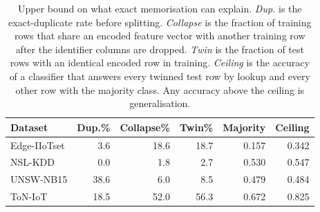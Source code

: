 \begin{table}[t]
\centering
\caption{Upper bound on what exact memorisation can explain. \emph{Dup.} is the exact-duplicate rate before splitting. \emph{Collapse} is the fraction of training rows that share an encoded feature vector with another training row after the identifier columns are dropped. \emph{Twin} is the fraction of test rows with an identical encoded row in training. \emph{Ceiling} is the accuracy of a classifier that answers every twinned test row by lookup and every other row with the majority class. Any accuracy above the ceiling is generalisation.}
\label{tab:memceiling}
\begin{tabular}{lrrrrr}
\toprule
Dataset & Dup.\% & Collapse\% & Twin\% & Majority & Ceiling \\
\midrule
Edge-IIoTset & 3.6 & 18.6 & 18.7 & 0.157 & 0.342 \\
NSL-KDD & 0.0 & 1.8 & 2.7 & 0.530 & 0.547 \\
UNSW-NB15 & 38.6 & 6.0 & 8.5 & 0.479 & 0.484 \\
ToN-IoT & 18.5 & 52.0 & 56.3 & 0.672 & 0.825 \\
\bottomrule
\end{tabular}

\end{table}
